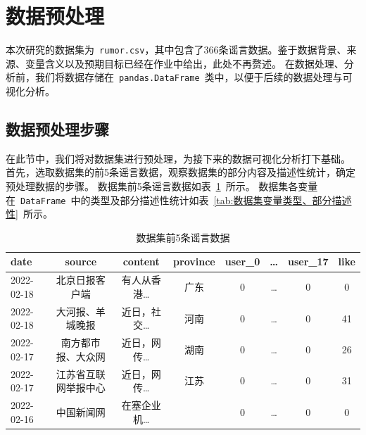 \documentclass[UTF8]{ctexart}
\begin{document}
\clearpage
\makecover

\pagebreak

\tableofcontents

\pagebreak

\section{数据预处理}

本次研究的数据集为~\verb|rumor.csv|，其中包含了366条谣言数据。鉴于数据背景、来源、变量含义以及预期目标已经在作业中给出，此处不再赘述。
在数据处理、分析前，我们将数据存储在~\verb|pandas.DataFrame|~类中，以便于后续的数据处理与可视化分析。

\subsection{数据预处理步骤}

在此节中，我们将对数据集进行预处理，为接下来的数据可视化分析打下基础。
首先，选取数据集的前5条谣言数据，观察数据集的部分内容及描述性统计，确定预处理数据的步骤。
数据集前5条谣言数据如表~\ref{tab:数据集内容}~所示。
数据集各变量在~\verb|DataFrame|~中的类型及部分描述性统计如表~\ref{tab:数据集变量类型、部分描述性}~所示。

\begin{table}[!ht] \centering
    \begin{tabularx}{\linewidth}{X c c c c c c c}
        \toprule
        date & source & content & province & user\_0 & \dots & user\_17 & like \\
        \midrule
        2022-02-18 & 北京日报客户端 & 有人从香港\dots & 广东 & 0 & \dots & 0 & 0 \\
        2022-02-18 & 大河报、羊城晚报 & 近日，社交\dots & 河南 & 0 & \dots & 0 & 41 \\
        2022-02-17 & 南方都市报、大众网 & 近日，网传\dots & 湖南 & 0 & \dots & 0 & 26 \\
        2022-02-17 & 江苏省互联网举报中心 & 近日，网传\dots & 江苏 & 0 & \dots & 0 & 31 \\
        2022-02-16 & 中国新闻网 & 在塞企业机\dots & \color{red}{NaN} & 0 & \dots & 0 & 0 \\
        \bottomrule
    \end{tabularx}
    \caption{数据集前5条谣言数据}
    \label{tab:数据集内容}
\end{table}
\end{document}
